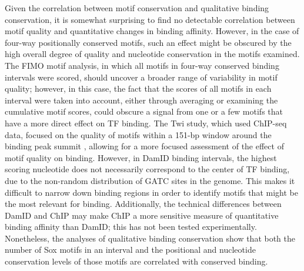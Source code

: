 Given the correlation between motif conservation and qualitative binding conservation, it is somewhat surprising to find no detectable correlation between motif quality and quantitative changes in binding affinity. However, in the case of four-way positionally conserved motifs, such an effect might be obscured by the high overall degree of quality and nucleotide conservation in the motifs examined. The FIMO motif analysis, in which all motifs in four-way conserved binding intervals were scored, should uncover a broader range of variability in motif quality; however, in this case, the fact that the scores of all motifs in each interval were taken into account, either through averaging or examining the cumulative motif scores, could obscure a signal from one or a few motifs that have a more direct effect on TF binding. The Twi study, which used ChIP-seq data, focused on the quality of motifs within a 151-bp window around the binding peak summit \citep{he_high_2011}, allowing for a more focused assessment of the effect of motif quality on binding. However, in DamID binding intervals, the highest scoring nucleotide does not necessarily correspond to the center of TF binding, due to the non-random distribution of GATC sites in the genome. This makes it difficult to narrow down binding regions in order to identify motifs that might be the most relevant for binding. Additionally, the technical differences between DamID and ChIP may make ChIP a more sensitive measure of quantitative binding affinity than DamID; this has not been tested experimentally. Nonetheless, the analyses of qualitative binding conservation show that both the number of Sox motifs in an interval and the positional and nucleotide conservation levels of those motifs are correlated with conserved binding.


